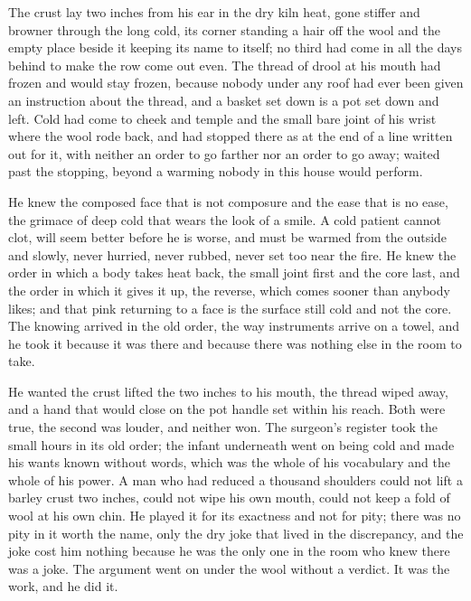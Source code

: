 The crust lay two inches from his ear in the dry kiln heat, gone stiffer and browner through the long cold, its corner standing a hair off the wool and the empty place beside it keeping its name to itself; no third had come in all the days behind to make the row come out even. The thread of drool at his mouth had frozen and would stay frozen, because nobody under any roof had ever been given an instruction about the thread, and a basket set down is a pot set down and left. Cold had come to cheek and temple and the small bare joint of his wrist where the wool rode back, and had stopped there as at the end of a line written out for it, with neither an order to go farther nor an order to go away;  waited past the stopping, beyond a warming nobody in this house would perform.

He knew the composed face that is not composure and the ease that is no ease, the grimace of deep cold that wears the look of a smile. A cold patient cannot clot, will seem better before he is worse, and must be warmed from the outside and slowly, never hurried, never rubbed, never set too near the fire. He knew the order in which a body takes heat back, the small joint first and the core last, and the order in which it gives it up, the reverse, which comes sooner than anybody likes; and that pink returning to a face is the surface still cold and not the core. The knowing arrived in the old order, the way instruments arrive on a towel, and he took it because it was there and because there was nothing else in the room to take.

He wanted the crust lifted the two inches to his mouth, the thread wiped away, and a hand that would close on the pot handle set within his reach. Both were true, the second was louder, and neither won. The surgeon's register took the small hours in its old order; the infant underneath went on being cold and made his wants known without words, which was the whole of his vocabulary and the whole of his power. A man who had reduced a thousand shoulders could not lift a barley crust two inches, could not wipe his own mouth, could not keep a fold of wool at his own chin. He played it for its exactness and not for pity; there was no pity in it worth the name, only the dry joke that lived in the discrepancy, and the joke cost him nothing because he was the only one in the room who knew there was a joke. The argument went on under the wool without a verdict. It was the work, and he did it.

\scenebreak

